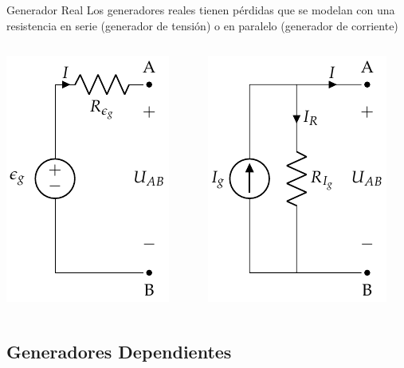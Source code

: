 \documentclass[aspectratio=169, usenames,svgnames,dvipsnames]{beamer}
\begin{document}
\begin{frame}[label={sec:org09b9068}]{Generador Real}
Los generadores reales tienen pérdidas que se modelan con una resistencia en \alert{serie} (generador de tensión) o en \alert{paralelo} (generador de corriente)
\begin{columns}
\begin{column}{0.5\columnwidth}
\begin{center}
\includegraphics[height=0.7\textheight]{../figs/FuenteTensionRealDC.pdf}
\end{center}
\end{column}
\begin{column}{0.5\columnwidth}
\begin{center}
\includegraphics[height=0.7\textheight]{../figs/FuenteCorrienteRealDC.pdf}
\end{center}
\end{column}
\end{columns}
\end{frame}
\subsection{Generadores Dependientes}
\label{sec:org194eb28}
\end{document}
